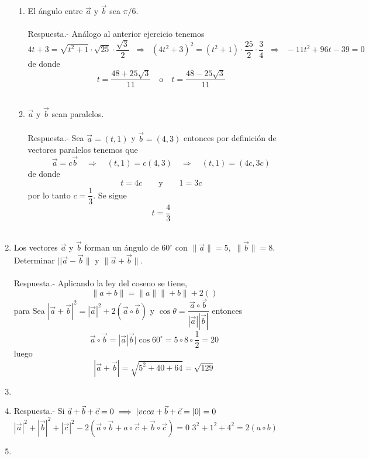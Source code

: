 \begin{enumerate}
\begin{enumerate}[\bfseries a)]
    \item El ángulo entre $\vec{a}$ y $\vec{b}$ sea $\pi/6$.\\\\
	Respuesta.-\; Análogo al anterior ejercicio tenemos $$4t+3=\sqrt{t^2+1}\cdot \sqrt{25}\cdot \dfrac{\sqrt{3}}{2}\;\; \Longrightarrow \; \; (4t^2+3)^2=(t^2+1)\cdot\dfrac{25}{2}\cdot \dfrac{3}{4}\;\; \Longrightarrow \; \; -11t^2+96t-39=0$$
	de donde $$t=\dfrac{48+25\sqrt{3}}{11} \quad \mbox{o} \quad t=\dfrac{48-25\sqrt{3}}{11}$$\\

    \item $\vec{a}$ y $\vec{b}$ sean paralelos.\\\\
	Respuesta.-\; Sea $\vec{a}=(t,1)$ y $\vec{b}=(4,3)$ entonces por definición de vectores paralelos tenemos que $$\vec{a}=c\vec{b} \quad \Longrightarrow \quad (t,1)=c(4,3) \quad \Longrightarrow \quad (t,1)=(4c,3c)$$
	de donde $$t=4c \qquad \mbox{y} \qquad 1=3c$$
	por lo tanto $c=\dfrac{1}{3}$. Se sigue $$t=\dfrac{4}{3}$$\\

\end{enumerate}

\item Los vectores $\vec{a}$ y $\vec{b}$ forman un ángulo de $60^\circ$ con $\|\vec{a}\|=5,$ $\|\vec{b}\|=8$. Determinar $||\vec{a}-\vec{b}\|$ y $\|\vec{a}+\vec{b}\|$.\\\\
    Respuesta.-\; Aplicando la ley del coseno se tiene, $$\|a+b\|=\|a\|\|+b\| + 2()$$  para Sea $|\vec{a}+\vec{b}|^2=|\vec{a}|^2 + 2(\vec{a}\circ \vec{b})$ y $\cos \theta = \dfrac{\vec{a}\circ \vec{b}}{|\vec{a}||\vec{b}|}$ entonces 
    $$\vec{a}\circ \vec{b}=|\vec{a}|\vec{b}|\cos 60^\circ = 5\circ 8 \circ \dfrac{1}{2}=20$$
    luego $$|\vec{a}+\vec{b}| = \sqrt{5^2+40+64} = \sqrt{129}$$

\item 

\item 
    Respuesta.-\; Si $\vec{a}+\vec{b}+\vec{c}=0 \; \Longrightarrow \; |\\vec{a}+\vec{b}+\vec{c}=|0|=0$
    $|\vec{a}|^2 + |\vec{b}|^2+|\vec{c}|^2 - 2(\vec{a}\circ \vec{b}+a\circ \vec{c}+\vec{b}\circ \vec{c})=0$
    $3^2 + 1^2 + 4^2 = 2(a\circ b)$

\item


\end{enumerate}
